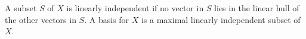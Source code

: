 A subset $S$ of $X$ is linearly independent if no vector in $S$ lies in the linear hull of the other vectors in $S$. A basis for $X$ is a maximal linearly independent subset of $X$.
